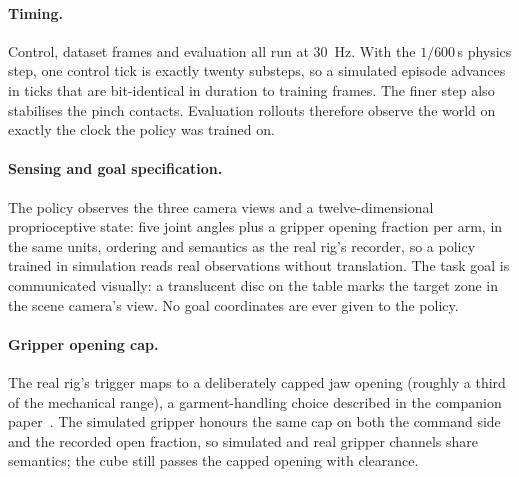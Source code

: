 \paragraph{Timing.}
Control, dataset frames and evaluation all run at \SI{30}{\hertz}. With
the $1/600$\,\si{\second} physics step, one control tick is exactly twenty
substeps, so a simulated episode advances in ticks that are bit-identical
in duration to training frames. The finer step also stabilises the
pinch contacts. Evaluation rollouts therefore observe the world on
exactly the clock the policy was trained on.

\paragraph{Sensing and goal specification.}
The policy observes the three camera views and a twelve-dimensional
proprioceptive state: five joint angles plus a gripper opening fraction
per arm, in the same units, ordering and semantics as the real rig's
recorder, so a policy trained in simulation reads real observations
without translation. The task goal is communicated visually: a
translucent disc on the table marks the target zone in the scene
camera's view. No goal coordinates are ever given to the policy.

\paragraph{Gripper opening cap.}
The real rig's trigger maps to a deliberately capped jaw opening
(roughly a third of the mechanical range), a garment-handling choice
described in the companion paper~\citep{so101teleop}. The simulated
gripper honours the same cap on both the command side and the recorded
open fraction, so simulated and real gripper channels share semantics;
the cube still passes the capped opening with clearance.
